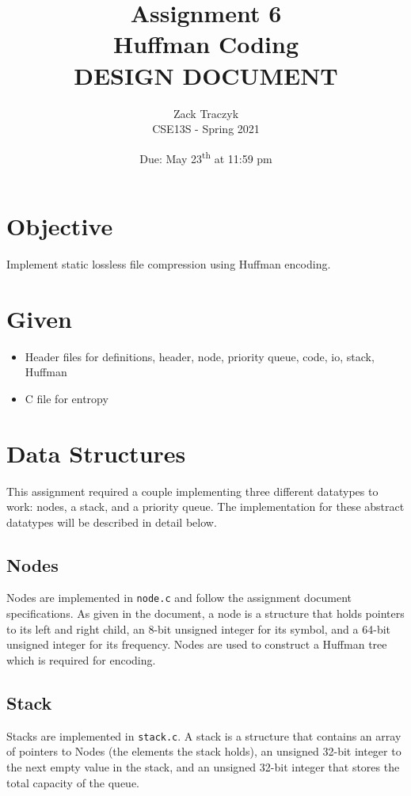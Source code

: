 \documentclass[12pt]{article}
\title{%
    \textbf{Assignment 6 \\ 
        Huffman Coding \\
\large DESIGN DOCUMENT} }
\author{Zack Traczyk \\ CSE13S - Spring 2021}
\date{Due: May 23\textsuperscript{th} at 11:59 pm}
\def\code#1{\texttt{#1}} %
\begin{document}
\maketitle

\section{Objective}

Implement static lossless file compression using Huffman encoding.

\section{Given}

\begin{itemize}
    \item{Header files for definitions, header, node, priority queue, code, io, stack, Huffman}
	\item{C file for entropy}
\end{itemize}


\section{Data Structures}

This assignment required a couple implementing three different datatypes to work:
nodes, a stack, and a priority queue. The implementation for these abstract
datatypes will be described in detail below.

\subsection{Nodes}

Nodes are implemented in \code{node.c} and follow the assignment document specifications.
As given in the document, a node is a structure that holds pointers to its left and 
right child, an 8-bit unsigned integer for its symbol, and a 64-bit unsigned integer 
for its frequency. Nodes are used to construct a Huffman tree which is required for
encoding.

\subsection{Stack}

Stacks are implemented in \code{stack.c}. A stack is a structure that contains an
array of pointers to Nodes (the elements the stack holds), an unsigned 32-bit integer
to the next empty value in the stack, and an unsigned 32-bit integer that stores the
total capacity of the queue.
\end{document}
